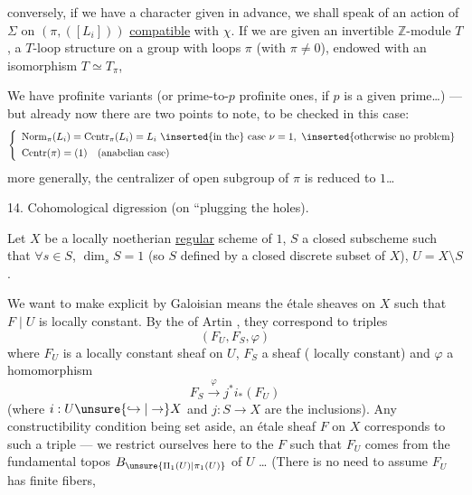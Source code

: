 

conversely, if we have a character  given in advance,
we shall speak of an action of $\Sigma$ on $(\pi,([L_i]))$
\uline{compatible} with $\chi$. If we are given an
invertible $\mathbb Z$-module $T$, a $T$-loop structure
on a group with loops $\pi$ (with $\pi\ne0$), endowed
with an isomorphism $T\simeq T_\pi$, 

We have profinite variants
(or prime-to-$p$ profinite ones, if $p$ is a given
prime\dots) --- but already now there are
two points to note, to be checked in
this case:
\[
\left\{
\begin{array}{l}
\operatorname{Norm}_{\pi}(L_i)=\operatorname{Centr}_{\pi}(L_i)=L_i
\ \inserted{\text{in the}}\ \text{case }\nu=1,\ \inserted{\text{otherwise no problem}}\\[4pt]
\operatorname{Centr}(\pi)=(1)\quad(\text{anabelian case})
\end{array}
\right.
\]
more generally, the centralizer
of  open subgroup of $\pi$
is reduced to $1$\dots
{}



14. Cohomological digression (on  ``plugging the
holes).

Let $X$ be a locally noetherian \uline{regular} scheme of
 $1$, $S$ a closed subscheme  such that
$\forall s\in S$, $\dim_s S=1$ (so $S$ defined by a
closed discrete subset of $X$), $U=X\setminus S$.

We want to make explicit by Galoisian means the
étale sheaves   on $X$ such that $F\mid U$ is
locally constant. By the  of Artin , they
correspond to triples
\[
(F_U,F_S,\varphi)
\]
where $F_U$ is a  locally constant sheaf on $U$,
$F_S$ a sheaf ( locally constant)
and $\varphi$ a homomorphism
\[
F_S\xrightarrow{\varphi}j^{*}i_{*}(F_U)
\]
(where $i:U\unsure{\hookrightarrow|\to}X$ and $j:S\to X$ are the inclusions).
Any constructibility condition being set
aside, an étale sheaf $F$ on $X$ corresponds
to such a triple --- we restrict ourselves here to the
$F$ such that $F_U$  comes from the
fundamental topos $B_{\unsure{\Pi_1(U)|\pi_1(U)}}$ of $U$ \dots
(There is no need to assume $F_U$ has finite fibers,


